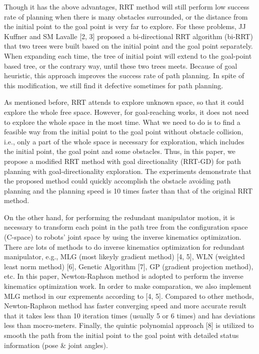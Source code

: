 \documentclass[letterpaper, 10 pt, conference]{ieeeconf}  %
\begin{document}
Though it has the above advantages, RRT method will still perform low success rate of planning when there is many obstacles surrounded, or the distance from the initial point to the goal point is very far to explore. For these problems, JJ Kuffner and SM Lavalle [2, 3] proposed a bi-directional RRT algorithm (bi-RRT) that two trees were built based on the initial point and the goal point separately. When expanding each time, the tree of initial point will extend to the goal-point based tree, or the contrary way, until these two trees meets. Because of goal heuristic, this approach improves the success rate of path planning. In spite of this modification, we still find it defective sometimes for path planning.

As mentioned before, RRT attends to explore unknown space, so that it could explore the whole free space. However, for goal-reaching works, it does not need to explore the whole space in the most time. What we need to do is to find a feasible way from the initial point to the goal point without obstacle collision, i.e., only a part of the whole space is necessary for exploration, which includes the initial point, the goal point and some obstacles. Thus, in this paper, we propose a modified RRT method with goal directionality (RRT-GD) for path planning with goal-directionality exploration. The experiments demonstrate that the proposed method could quickly accomplish the obstacle avoiding path planning and the planning speed is 10 times faster than that of the original RRT method.

On the other hand, for performing the redundant manipulator motion, it is necessary to transform each point in the path tree from the configuration space (C-space) to robots' joint space by using the inverse kinematics optimization. There are lots of methods to do inverse kinematics optimization for redundant manipulator, e.g., MLG (most likeyly gradient method) [4, 5], WLN (weighted least norm method) [6], Genetic Algorithm [7], GP (gradient projection method), etc. In this paper, Newton-Raphson method is adopted to perform the inverse kinematics optimization work. In order to make comparation, we also implement MLG method in our exprements according to [4, 5].
Compared to other methods, Newton-Raphson method has faster converging speed and more accurate result that it takes less than 10 iteration times (usually 5 or 6 times) and has deviations less than mocro-meters. Finally, the quintic polynomial approach [8] is utilized to smooth the path from the initial point to the goal point with detailed status information (pose \& joint angles).
\end{document}
